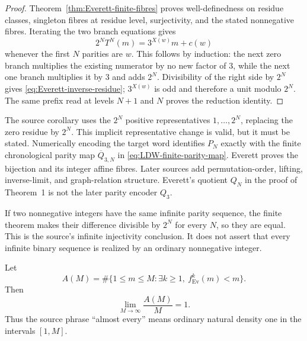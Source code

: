 \begin{proof}
Theorem~\ref{thm:Everett-finite-fibres} proves well-definedness on residue
classes, singleton fibres at residue level, surjectivity, and the stated
nonnegative fibres.  Iterating the two branch equations gives
\begin{equation}
\label{eq:Everett-word-affine-composition}
 2^NT^N(m)=3^{X(w)}m+c(w)
\end{equation}
whenever the first \(N\) parities are \(w\).  This follows by induction: the
next zero branch multiplies the existing numerator by no new factor of \(3\),
while the next one branch multiplies it by \(3\) and adds \(2^N\).
Divisibility of the right side by \(2^N\) gives
\eqref{eq:Everett-inverse-residue}; \(3^{X(w)}\) is odd and therefore a unit
modulo \(2^N\).  The same prefix read at levels \(N+1\) and \(N\) proves the
reduction identity.
\end{proof}

The source corollary uses the \(2^N\) positive representatives
\(1,\ldots,2^N\), replacing the zero residue by \(2^N\).  This implicit
representative change is valid, but it must be stated.  Numerically encoding
the target word identifies \(P_N\) exactly with the finite chronological
parity map \(\overline Q_{3,N}\) in
\eqref{eq:LDW-finite-parity-map}.  Everett proves the bijection and its
integer affine fibres.  Later sources add permutation-order, lifting,
inverse-limit, and graph-relation structure.  Everett's quotient \(Q_N\) in
the proof of Theorem~1 is not the later parity encoder \(Q_3\).

If two nonnegative integers have the same infinite parity sequence, the
finite theorem makes their difference divisible by \(2^N\) for every \(N\),
so they are equal.  This is the source's infinite injectivity conclusion.  It
does not assert that every infinite binary sequence is realized by an
ordinary nonnegative integer.

\begin{theorem}
\label{thm:Everett-density-one-descent}
Let
\begin{equation}
\label{eq:Everett-AM}
 A(M)=\#\{1\le m\le M:\exists k\ge1,\ f_{\mathrm{Ev}}^k(m)<m\}.
\end{equation}
Then
\begin{equation}
\label{eq:Everett-density-limit}
 \lim_{M\to\infty}\frac{A(M)}M=1.
\end{equation}
Thus the source phrase ``almost every'' means ordinary natural density one
in the intervals \([1,M]\).
\end{theorem}

